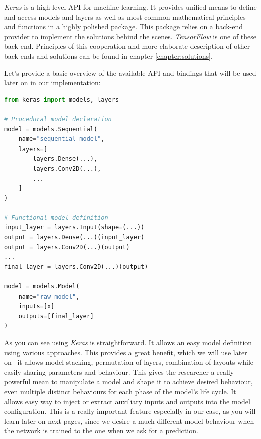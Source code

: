 \textit{Keras} is a high level API for machine learning. It provides unified means to define and access models and layers as well as most common mathematical principles and functions in a highly polished package. This package relies on a back-end provider to implement the solutions behind the scenes. \textit{TensorFlow} is one of these back-end. Principles of this cooperation and more elaborate description of other back-ends and solutions can be found in chapter \ref{chapter:solutions}.

Let's provide a basic overview of the available API and bindings that will be used later on in our implementation:

\begin{lstlisting}[language=Python, caption=Keras example]
from keras import models, layers

# Procedural model declaration
model = models.Sequential(
    name="sequential_model",
    layers=[
        layers.Dense(...),
        layers.Conv2D(...),
        ...
    ]
)

# Functional model definition
input_layer = layers.Input(shape=(...))
output = layers.Dense(...)(input_layer)
output = layers.Conv2D(...)(output)
...
final_layer = layers.Conv2D(...)(output)

model = models.Model(
    name="raw_model",
    inputs=[x]
    outputs=[final_layer]
)
\end{lstlisting}

As you can see using \textit{Keras} is straightforward. It allows an easy model definition using various approaches. This provides a great benefit, which we will use later on\,--\,it allows model stacking, permutation of layers, combination of layouts while easily sharing parameters and behaviour. This gives the researcher a really powerful mean to manipulate a model and shape it to achieve desired behaviour, even multiple distinct behaviours for each phase of the model's life cycle. It allows easy way to inject or extract auxiliary inputs and outputs into the model configuration. This is a really important feature especially in our case, as you will learn later on next pages, since we desire a much different model behaviour when the network is trained to the one when we ask for a prediction.

